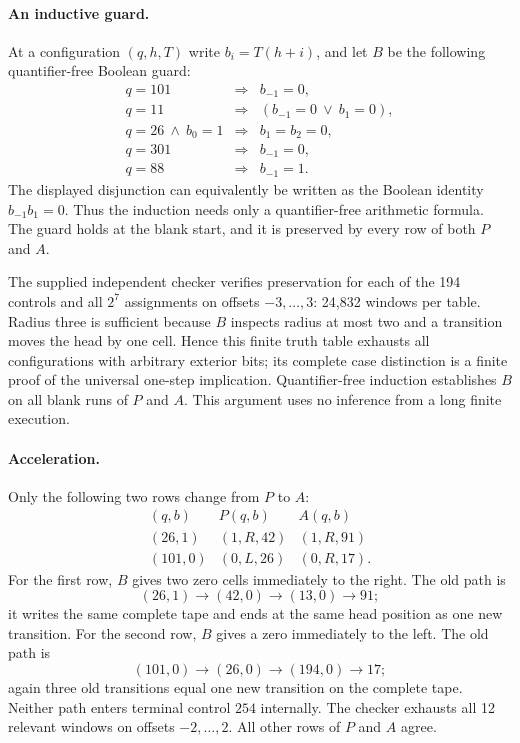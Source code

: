 \paragraph{An inductive guard.}
At a configuration $(q,h,T)$ write $b_i=T(h+i)$, and let $B$ be the
following quantifier-free Boolean guard:
\[
\begin{array}{rcl}
 q=101&\Longrightarrow& b_{-1}=0,\\
 q=11 &\Longrightarrow& (b_{-1}=0\ \lor\ b_1=0),\\
 q=26\ \land\ b_0=1&\Longrightarrow& b_1=b_2=0,\\
 q=301&\Longrightarrow& b_{-1}=0,\\
 q=88&\Longrightarrow& b_{-1}=1.
\end{array}
\]
The displayed disjunction can equivalently be written as the Boolean
identity $b_{-1}b_1=0$.  Thus the induction needs only a quantifier-free
arithmetic formula.  The guard holds at the blank start, and it is
preserved by every row of both $P$ and $A$.

The supplied independent checker verifies preservation for each of the
194 controls and all $2^7$ assignments on offsets $-3,\ldots,3$:
24,832 windows per table.  Radius three is sufficient because $B$ inspects
radius at most two and a transition moves the head by one cell.  Hence
this finite truth table exhausts all configurations with arbitrary exterior
bits; its complete case distinction is a finite proof of the universal
one-step implication.  Quantifier-free induction establishes $B$ on all
blank runs of $P$ and $A$.  This argument uses no inference from a long
finite execution.

\paragraph{Acceleration.}
Only the following two rows change from $P$ to $A$:
\[
\begin{array}{c|c|c}
 (q,b)&P(q,b)&A(q,b)\\\hline
 (26,1)&(1,R,42)&(1,R,91)\\
 (101,0)&(0,L,26)&(0,R,17).
\end{array}
\]
For the first row, $B$ gives two zero cells immediately to the right.
The old path is
\[
 (26,1)\to(42,0)\to(13,0)\to91;
\]
it writes the same complete tape and ends at the same head position as
one new transition.  For the second row, $B$ gives a zero immediately to
the left.  The old path is
\[
 (101,0)\to(26,0)\to(194,0)\to17;
\]
again three old transitions equal one new transition on the complete tape.
Neither path enters terminal control $254$ internally.  The checker
exhausts all 12 relevant windows on offsets $-2,\ldots,2$.
All other rows of $P$ and $A$ agree.

